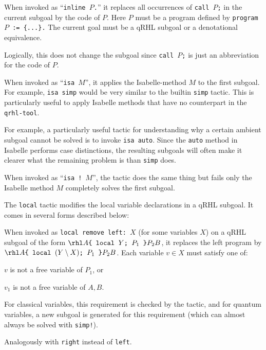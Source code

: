 \documentclass{article}
\begin{document}

When invoked as ``\texttt{inline $P$.}''
it replaces all occurrences of \texttt{call $P$;}
in the current subgoal by the code of $P$.
Here $P$
must be a program defined by \texttt{program $P$ := \{...\}.}
The current goal must be a qRHL subgoal or a denotational equivalence.

Logically, this does not change the subgoal since \texttt{call $P$;}
is just an abbreviation for the code of $P$.


When invoked as ``\texttt{isa $M$}'', it applies the Isabelle-method
$M$ to the first subgoal. For example, \texttt{isa simp} would be very
similar to the builtin \texttt{simp} tactic. This is particularly
useful to apply Isabelle methods that have no counterpart in the
\texttt{qrhl-tool}.

For example, a particularly useful tactic for understanding why a
certain ambient subgoal cannot be solved is to invoke \texttt{isa
  auto}. Since the \texttt{auto} method in Isabelle performs case
distinctions, the resulting subgoals will often make it clearer what
the remaining problem is than \texttt{simp} does.

When invoked as ``\texttt{isa ! $M$}'', the tactic does the same thing
but fails only the Isabelle method $M$ completely solves the first
subgoal.



The \texttt{local} tactic modifies the local variable declarations in
a qRHL subgoal. It comes in several forms described below:

When invoked as \texttt{local remove left: $X$} (for some variables $X$) on a
qRHL subgoal of the form $\rhl A{\texttt{\{~local $Y$;
    $P_1$~\}}}{P_2} B$, it replaces the left program by
$\rhl A{\texttt{\{~local $(Y\setminus X)$; $P_1$~\}}}{P_2} B$.
Each variable $v\in X$ must satisfy one of:
\begin{compactitem}
  \item $v$ is not a free variable of $P_1$, or
  \item $v_1$ is not a free variable of $A,B$.
\end{compactitem}
For classical variables, this requirement is checked by the tactic,
and for quantum variables, a new subgoal is generated for this
requirement (which can almost always be solved with \texttt{simp!}).

Analogously with \texttt{right} instead of \texttt{left}.
\end{document}
